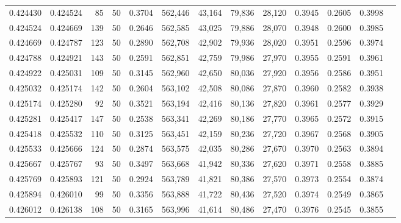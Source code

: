 \begin{tabular}{rrrrrrrrrrrrr}
0.424430 & 0.424524 &    85 &  50 &                                     0.3704 & 562,446 &  43,164 &  79,836 &  28,120 & 0.3945 & 0.2605 & 0.3998 \\
0.424524 & 0.424669 &   139 &  50 &                                     0.2646 & 562,585 &  43,025 &  79,886 &  28,070 & 0.3948 & 0.2600 & 0.3985 \\
0.424669 & 0.424787 &   123 &  50 &                                     0.2890 & 562,708 &  42,902 &  79,936 &  28,020 & 0.3951 & 0.2596 & 0.3974 \\
0.424788 & 0.424921 &   143 &  50 &                                     0.2591 & 562,851 &  42,759 &  79,986 &  27,970 & 0.3955 & 0.2591 & 0.3961 \\
0.424922 & 0.425031 &   109 &  50 &                                     0.3145 & 562,960 &  42,650 &  80,036 &  27,920 & 0.3956 & 0.2586 & 0.3951 \\
0.425032 & 0.425174 &   142 &  50 &                                     0.2604 & 563,102 &  42,508 &  80,086 &  27,870 & 0.3960 & 0.2582 & 0.3938 \\
0.425174 & 0.425280 &    92 &  50 &                                     0.3521 & 563,194 &  42,416 &  80,136 &  27,820 & 0.3961 & 0.2577 & 0.3929 \\
0.425281 & 0.425417 &   147 &  50 &                                     0.2538 & 563,341 &  42,269 &  80,186 &  27,770 & 0.3965 & 0.2572 & 0.3915 \\
0.425418 & 0.425532 &   110 &  50 &                                     0.3125 & 563,451 &  42,159 &  80,236 &  27,720 & 0.3967 & 0.2568 & 0.3905 \\
0.425533 & 0.425666 &   124 &  50 &                                     0.2874 & 563,575 &  42,035 &  80,286 &  27,670 & 0.3970 & 0.2563 & 0.3894 \\
0.425667 & 0.425767 &    93 &  50 &                                     0.3497 & 563,668 &  41,942 &  80,336 &  27,620 & 0.3971 & 0.2558 & 0.3885 \\
0.425769 & 0.425893 &   121 &  50 &                                     0.2924 & 563,789 &  41,821 &  80,386 &  27,570 & 0.3973 & 0.2554 & 0.3874 \\
0.425894 & 0.426010 &    99 &  50 &                                     0.3356 & 563,888 &  41,722 &  80,436 &  27,520 & 0.3974 & 0.2549 & 0.3865 \\
0.426012 & 0.426138 &   108 &  50 &                                     0.3165 & 563,996 &  41,614 &  80,486 &  27,470 & 0.3976 & 0.2545 & 0.3855 \\

\end{tabular}
